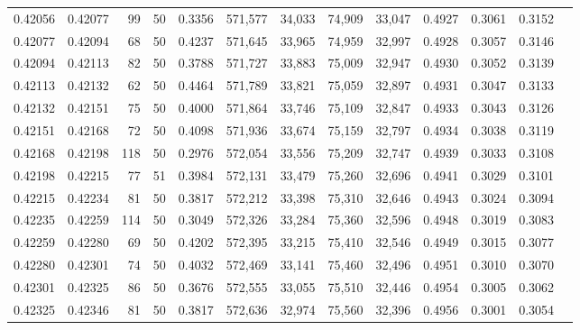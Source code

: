 \begin{tabular}{rrrrrrrrrrrrr}
0.42056 & 0.42077 &    99 &  50 &                                     0.3356 & 571,577 &  34,033 &  74,909 &  33,047 & 0.4927 & 0.3061 & 0.3152 \\
0.42077 & 0.42094 &    68 &  50 &                                     0.4237 & 571,645 &  33,965 &  74,959 &  32,997 & 0.4928 & 0.3057 & 0.3146 \\
0.42094 & 0.42113 &    82 &  50 &                                     0.3788 & 571,727 &  33,883 &  75,009 &  32,947 & 0.4930 & 0.3052 & 0.3139 \\
0.42113 & 0.42132 &    62 &  50 &                                     0.4464 & 571,789 &  33,821 &  75,059 &  32,897 & 0.4931 & 0.3047 & 0.3133 \\
0.42132 & 0.42151 &    75 &  50 &                                     0.4000 & 571,864 &  33,746 &  75,109 &  32,847 & 0.4933 & 0.3043 & 0.3126 \\
0.42151 & 0.42168 &    72 &  50 &                                     0.4098 & 571,936 &  33,674 &  75,159 &  32,797 & 0.4934 & 0.3038 & 0.3119 \\
0.42168 & 0.42198 &   118 &  50 &                                     0.2976 & 572,054 &  33,556 &  75,209 &  32,747 & 0.4939 & 0.3033 & 0.3108 \\
0.42198 & 0.42215 &    77 &  51 &                                     0.3984 & 572,131 &  33,479 &  75,260 &  32,696 & 0.4941 & 0.3029 & 0.3101 \\
0.42215 & 0.42234 &    81 &  50 &                                     0.3817 & 572,212 &  33,398 &  75,310 &  32,646 & 0.4943 & 0.3024 & 0.3094 \\
0.42235 & 0.42259 &   114 &  50 &                                     0.3049 & 572,326 &  33,284 &  75,360 &  32,596 & 0.4948 & 0.3019 & 0.3083 \\
0.42259 & 0.42280 &    69 &  50 &                                     0.4202 & 572,395 &  33,215 &  75,410 &  32,546 & 0.4949 & 0.3015 & 0.3077 \\
0.42280 & 0.42301 &    74 &  50 &                                     0.4032 & 572,469 &  33,141 &  75,460 &  32,496 & 0.4951 & 0.3010 & 0.3070 \\
0.42301 & 0.42325 &    86 &  50 &                                     0.3676 & 572,555 &  33,055 &  75,510 &  32,446 & 0.4954 & 0.3005 & 0.3062 \\
0.42325 & 0.42346 &    81 &  50 &                                     0.3817 & 572,636 &  32,974 &  75,560 &  32,396 & 0.4956 & 0.3001 & 0.3054 \\

\end{tabular}
